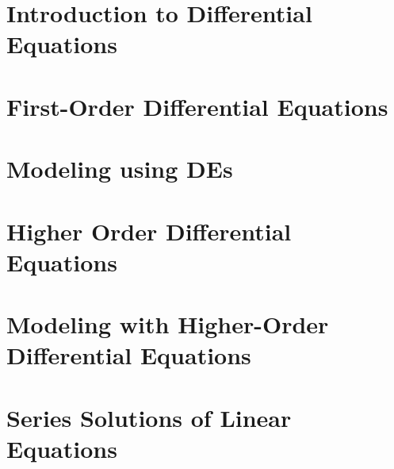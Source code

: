 \documentclass[12pt]{report}
\begin{document}
\maketitle
\tableofcontents

\chapter[Introduction to Diff-Eq]{Introduction to Differential Equations}\label{ch:introduction-to-differential-equations}

\chapter{First-Order Differential Equations}\label{ch:first-order-differential-equations}

\chapter{Modeling using DEs}\label{ch:modeling-using-des}

\chapter[Higher Order DE{s}]{Higher Order Differential Equations}\label{ch:higher-order-differential-equations}

\chapter[Modeling with Higher-Order DEs]{Modeling with Higher-Order Differential Equations}\label{ch:modeling-with-higher-order-differential-equations}

\chapter{Series Solutions of Linear Equations}\label{ch:series-solutions-of-linear-equations}
\end{document}
